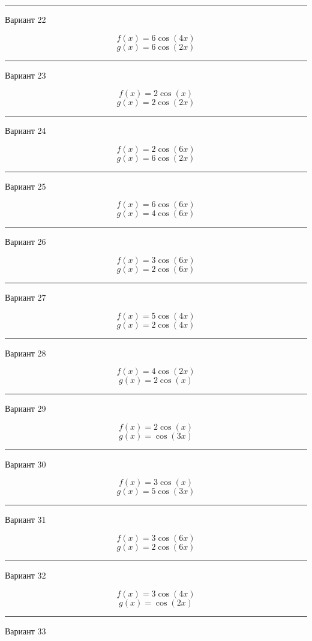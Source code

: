 \documentclass[11pt]{report}
\begin{document}
\rule{\textwidth}{.2mm}

Вариант 22

$$f(x)=6 \cos{\left(4 x \right)}$$
$$g(x)=6 \cos{\left(2 x \right)}$$

\rule{\textwidth}{.2mm}

Вариант 23

$$f(x)=2 \cos{\left(x \right)}$$
$$g(x)=2 \cos{\left(2 x \right)}$$

\rule{\textwidth}{.2mm}

Вариант 24

$$f(x)=2 \cos{\left(6 x \right)}$$
$$g(x)=6 \cos{\left(2 x \right)}$$

\rule{\textwidth}{.2mm}

Вариант 25

$$f(x)=6 \cos{\left(6 x \right)}$$
$$g(x)=4 \cos{\left(6 x \right)}$$

\rule{\textwidth}{.2mm}

Вариант 26

$$f(x)=3 \cos{\left(6 x \right)}$$
$$g(x)=2 \cos{\left(6 x \right)}$$

\rule{\textwidth}{.2mm}

Вариант 27

$$f(x)=5 \cos{\left(4 x \right)}$$
$$g(x)=2 \cos{\left(4 x \right)}$$

\rule{\textwidth}{.2mm}

Вариант 28

$$f(x)=4 \cos{\left(2 x \right)}$$
$$g(x)=2 \cos{\left(x \right)}$$

\rule{\textwidth}{.2mm}

Вариант 29

$$f(x)=2 \cos{\left(x \right)}$$
$$g(x)=\cos{\left(3 x \right)}$$

\rule{\textwidth}{.2mm}

Вариант 30

$$f(x)=3 \cos{\left(x \right)}$$
$$g(x)=5 \cos{\left(3 x \right)}$$

\rule{\textwidth}{.2mm}

Вариант 31

$$f(x)=3 \cos{\left(6 x \right)}$$
$$g(x)=2 \cos{\left(6 x \right)}$$

\rule{\textwidth}{.2mm}

Вариант 32

$$f(x)=3 \cos{\left(4 x \right)}$$
$$g(x)=\cos{\left(2 x \right)}$$

\rule{\textwidth}{.2mm}

Вариант 33
\end{document}

